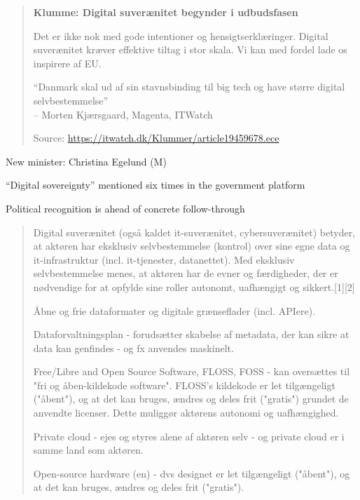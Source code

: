 \documentclass[Screen16to9,17pt]{foils}
\begin{document}
\begin{quote} {\large \bf
Klumme: Digital suverænitet begynder i udbudsfasen}

Det er ikke nok med gode intentioner og hensigtserklæringer. Digital suverænitet kræver effektive tiltag i stor skala. Vi kan med fordel lade os inspirere af EU.

``Danmark skal ud af sin stavnsbinding til big tech og have større digital selvbestemmelse''\\
-- Morten Kj{\ae}rsgaard, Magenta, ITWatch

Source: \url{https://itwatch.dk/Klummer/article19459678.ece}
\end{quote}
\begin{list2}
\item New minister: Christina Egelund (M)
\item ``Digital sovereignty'' mentioned six times in the government platform
\item Political recognition is ahead of concrete follow-through
\end{list2}




\begin{quote}
Digital suverænitet (også kaldet it-suverænitet, cybersuverænitet) betyder, at aktøren har eksklusiv selvbestemmelse (kontrol) over sine egne data og it-infrastruktur (incl. it-tjenester, datanettet). Med eksklusiv selvbestemmelse menes, at aktøren har de evner og færdigheder, der er nødvendige for at opfylde sine roller autonomt, uafhængigt og sikkert.[1][2]

\begin{list2}
\item Åbne og frie dataformater og digitale grænseflader (incl. APIere).
\item Dataforvaltningsplan - forudsætter skabelse af metadata, der kan sikre at data kan genfindes - og fx anvendes maskinelt.
\item Free/Libre and Open Source Software, FLOSS, FOSS - kan oversættes til "fri og åben-kildekode software". FLOSS's kildekode er let tilgængeligt ("åbent"), og at det kan bruges, ændres og deles frit ("gratis") grundet de anvendte licenser. Dette muliggør aktørens autonomi og uafhængighed.
\item Private cloud - ejes og styres alene af aktøren selv - og private cloud er i samme land som aktøren.
\item Open-source hardware (en) - dvs designet er let tilgængeligt ("åbent"), og at det kan bruges, ændres og deles frit ("gratis").
\end{list2}
\end{quote}
\end{document}

